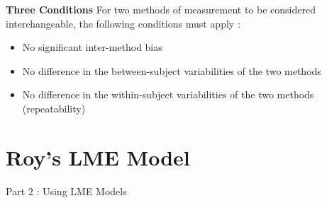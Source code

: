 \documentclass[compress]{beamer}        %
\makeatletter
\newcommand{\tcb}{\textcolor{beamer@blendedblue}}
\makeatother
\begin{document}
		
		\begin{frame}{\bf \tcb{Three Conditions}}
			\Large
			For two methods of measurement to be considered interchangeable, the following conditions must apply \cite{Roy2009}:
			\\
			\begin{itemize}\itemsep0.5cm
				\item No significant inter-method bias
				\item No difference in the between-subject variabilities of the two methods
				\item No difference in the within-subject variabilities of the two methods (repeatability)
			\end{itemize}
		\end{frame}
	
		\section[Roy's LME Model]{Roy's LME Model}
\begin{frame}
	\huge
	Part 2 :  Using LME Models
\end{frame}	
\end{document}
